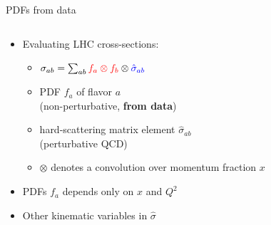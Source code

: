 \begin{frame}[t]{PDFs from data}
  \vspace*{-0.5cm}
  \begin{columns}[T]
    \begin{column}[T]{0.49\textwidth}
      \begin{itemize}
        \item Evaluating LHC cross-sections:
          \begin{itemize}
            \itemsep 0.5em
            \item $\sigma_{ab} = \sum_{ab} {\color{red} f_a \otimes f_b} \otimes {\color{blue}\hat{\sigma}_{ab}}$
            \item PDF {\color{red}$f_a$} of flavor $a$ \\
            (non-perturbative, {\bf from data})
            \item hard-scattering matrix element {\color{blue}$\hat{\sigma}_{ab}$} \\(perturbative QCD)
            \item $\otimes$ denotes a convolution over momentum fraction $x$
          \end{itemize}
          \item PDFs {\color{red}$f_a$} depends only on $x$ and $Q^2$
          \item Other kinematic variables in {\color{blue}$\hat{\sigma}$}
      \end{itemize}
      \vspace*{0.3cm}
    \end{column}
    \begin{column}{0.49\textwidth}
      \begin{center}
      \end{center}
    \end{column}
  \end{columns}
\end{frame}


